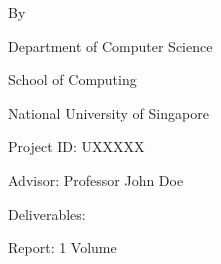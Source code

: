 \begin{titlepage}
    {\centering
    {\large \projecttype}
    \vfill
    {\LARGE\bfseries \projecttitle\par}
    \vspace{2cm}
    {\large By\par \authorname}
    \vfill
    {\normalsize Department of Computer Science\par
    School of Computing\par
    National University of Singapore\par}
    \vspace{1cm}
    {\normalsize \academicyear\par}
    }
    \vspace{1cm}
    Project ID: UXXXXX \par
    Advisor: Professor John Doe \par
    \vspace{1cm}
    Deliverables: \par
    \begin{list}{\quad}{}
        \item Report: 1 Volume
    \end{list}
\end{titlepage}
\restoregeometry
\pagebreak
